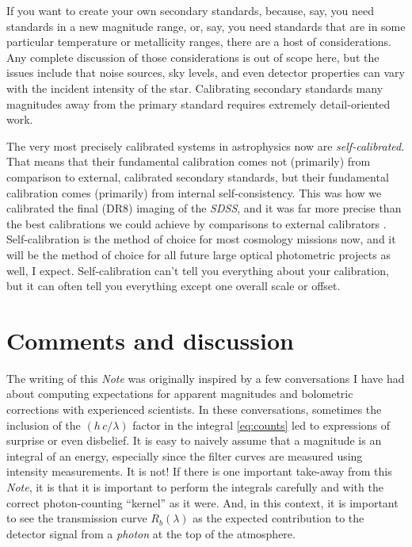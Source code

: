 \documentclass[10pt]{article}
\newcommand{\documentname}{\textsl{Note}}
\begin{document}
If you want to create your own secondary standards, because, say, you need standards in a new magnitude range, or, say, you need standards that are in some particular temperature or metallicity ranges, there are a host of considerations.
Any complete discussion of those considerations is out of scope here, but the issues include that noise sources, sky levels, and even detector properties can vary with the incident intensity of the star.
Calibrating secondary standards many magnitudes away from the primary standard requires extremely detail-oriented work.

The very most precisely calibrated systems in astrophysics now are \emph{self-calibrated}.
That means that their fundamental calibration comes not (primarily) from comparison to external, calibrated secondary standards, but their fundamental calibration comes (primarily) from internal self-consistency.
This was how we calibrated the final (DR8) imaging of the \textsl{SDSS}, and it was far more precise than the best calibrations we could achieve by comparisons to external calibrators \cite{ubercal}.
Self-calibration is the method of choice for most cosmology missions now, and it will be the method of choice for all future large optical photometric projects as well, I expect.
Self-calibration can't tell you everything about your calibration, but it can often tell you everything except one overall scale or offset.

\section{Comments and discussion}\label{sec:discussion}

The writing of this \documentname{} was originally inspired by a few conversations I have had about computing expectations for apparent magnitudes and bolometric corrections with experienced scientists.
In these conversations, sometimes the inclusion of the $(h\,c/\lambda)$ factor in the integral \eqref{eq:counts} led to expressions of surprise or even disbelief.
It is easy to naively assume that a magnitude is an integral of an energy, especially since the filter curves are measured using intensity measurements.
It is not!
If there is one important take-away from this \documentname, it is that it is important to perform the integrals carefully and with the correct photon-counting ``kernel'' as it were.
And, in this context, it is important to see the transmission curve $R_b(\lambda)$ as the expected contribution to the detector signal from a \emph{photon} at the top of the atmosphere.
\end{document}
